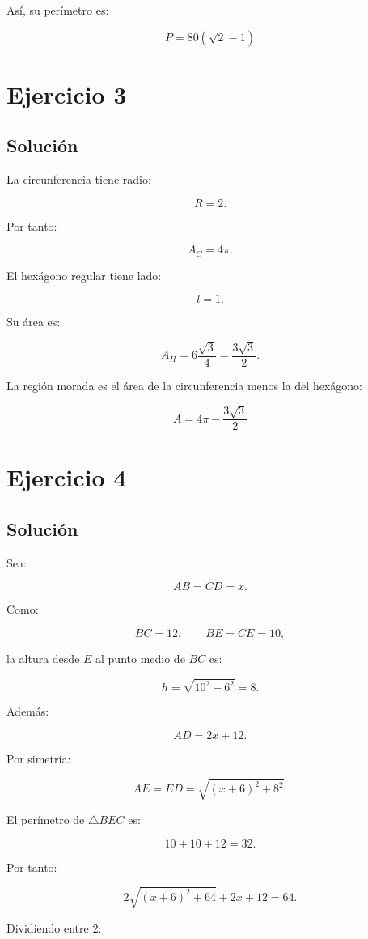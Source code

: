 \documentclass[11pt,a4paper]{article}
\begin{document}
Así, su perímetro es:

\[
\boxed{
P
=
80(\sqrt2-1)
}
\]

\section{Ejercicio 3}
\subsection{Solución}

La circunferencia tiene radio:

\[
R=2.
\]

Por tanto:

\[
A_C=4\pi.
\]

El hexágono regular tiene lado:

\[
l=1.
\]

Su área es:

\[
A_H
=
6\frac{\sqrt3}{4}
=
\frac{3\sqrt3}{2}.
\]

La región morada es el área de la circunferencia menos la del hexágono:

\[
\boxed{
A
=
4\pi-\frac{3\sqrt3}{2}
}
\]

\section{Ejercicio 4}
\subsection{Solución}

Sea:

\[
AB=CD=x.
\]

Como:

\[
BC=12,
\qquad
BE=CE=10,
\]

la altura desde \(E\) al punto medio de \(BC\) es:

\[
h
=
\sqrt{10^2-6^2}
=
8.
\]

Además:

\[
AD=2x+12.
\]

Por simetría:

\[
AE=ED
=
\sqrt{(x+6)^2+8^2}.
\]

El perímetro de \(\triangle BEC\) es:

\[
10+10+12=32.
\]

Por tanto:

\[
2\sqrt{(x+6)^2+64}
+
2x+12
=
64.
\]

Dividiendo entre \(2\):
\end{document}
